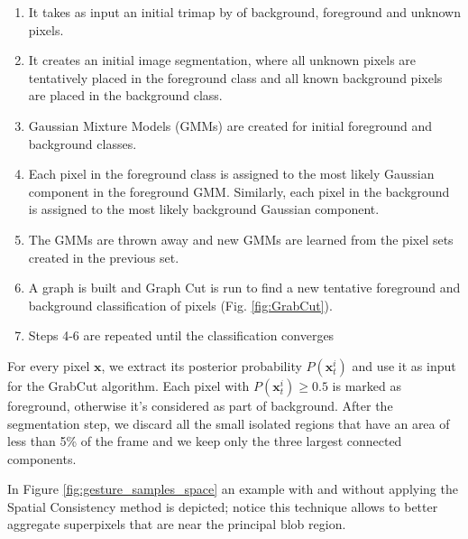 \begin{enumerate}
\item It takes as input an initial trimap by of background, foreground and unknown pixels.
\item It creates an initial image segmentation, where all unknown
pixels are tentatively placed in the foreground class
and all known background pixels are placed in the background
class.
\item Gaussian Mixture Models (GMMs) are created for initial foreground
and background classes.
\item Each pixel in the foreground class is assigned to the most
likely Gaussian component in the foreground GMM. Similarly,
each pixel in the background is assigned to the most
likely background Gaussian component.
\item The GMMs are thrown away and new GMMs are learned from
the pixel sets created in the previous set.
\item A graph is built and Graph Cut is run to find a new tentative
foreground and background classification of pixels (Fig. \ref{fig:GrabCut}).
\item Steps 4-6 are repeated until the classification converges

\end{enumerate}

For every pixel $\mathbf{x}$, we extract its posterior probability $P(\mathbf{x}_{t}^{i})$ and use it as input for the GrabCut algorithm. Each pixel with $P(\mathbf{x}_{t}^{i}) \geq 0.5$ is marked as foreground, otherwise it's considered as part of background. After the segmentation step, we discard all the small isolated regions that have an area of less than 5\% of the frame and we keep only the three largest connected components.

In Figure \ref{fig:gesture_samples_space} an example with and without applying the Spatial Consistency method is depicted; notice this technique allows to better aggregate superpixels that are near the principal blob region.


